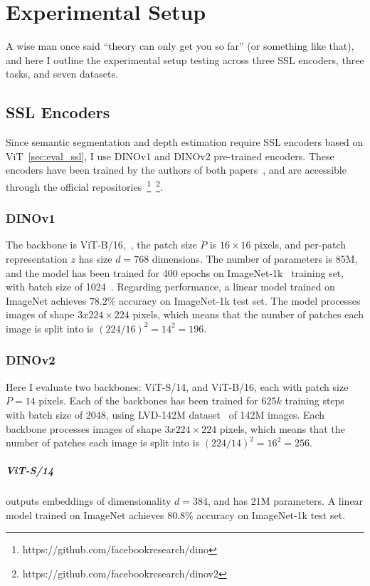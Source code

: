 \chapter{Experimental Setup}\label{chap:exp_setup}

A wise man once said ``theory can only get you so far'' (or something like that), and here I outline the experimental setup testing \EmbedAttack across three SSL encoders, three tasks, and seven datasets.

\section{SSL Encoders}

Since semantic segmentation and depth estimation require SSL encoders based on ViT~\cref{sec:eval_ssl}, I use DINOv1 and DINOv2 pre-trained encoders. These encoders have been trained by the authors of both papers~\cite{dinov1,dinov2}, and are accessible through the official repositories~\footnote{https://github.com/facebookresearch/dino}~\footnote{https://github.com/facebookresearch/dinov2}.

\subsection{DINOv1}

The backbone is ViT-B/16,~\ie, the patch size $P$ is $16\times 16$ pixels, and per-patch representation $z$ has size $d=768$ dimensions. The number of parameters is 85M, and the model has been trained for 400 epochs on ImageNet-1k~\cite{imagenet} training set, with batch size of 1024~\cite{dinov1}. Regarding performance, a linear model trained on ImageNet achieves $78.2\%$ accuracy on ImageNet-1k test set. The model processes images of shape $3x224\times 224$ pixels, which means that the number of patches each image is split into is $(224/16)^2=14^2=196$.

\subsection{DINOv2}

Here I evaluate two backbones: ViT-S/14, and ViT-B/16, each with patch size $P=14$ pixels. Each of the backbones has been trained for $625k$ training steps with batch size of 2048, using LVD-142M dataset~\cite{dinov2} of 142M images. Each backbone processes images of shape $3x224\times 224$ pixels, which means that the number of patches each image is split into is $(224/14)^2=16^2=256$.
\paragraph{ViT-S/14} outputs embeddings of dimensionality $d=384$, and has 21M parameters. A linear model trained on ImageNet achieves $80.8\%$ accuracy on ImageNet-1k test set.

